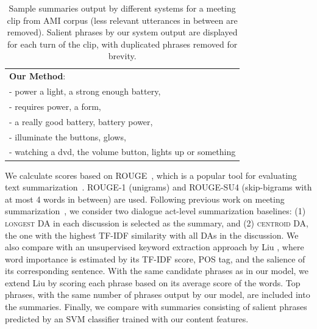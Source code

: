 \begin{table}[ht]
{{\begin{tabular}{|p{75mm}|}
	\textbf{Our Method}: \\
	- power a light, a strong enough battery, \\
	- requires power, a form, \\
	- a really good battery, battery power, \\
	- illuminate the buttons, glows, \\
	- watching a dvd, the volume button, lights up or something\\	
    \hline
    \end{tabular}
    
    }
	\caption{\fontsize{10}{12}\selectfont Sample summaries output by different systems for a meeting clip from AMI corpus (less relevant utterances in between are removed). Salient phrases by our system output are displayed for each turn of the clip, with duplicated phrases removed for brevity. }%
\label{fig:example_summary}
}
\end{table}




We calculate scores based on ROUGE~\cite{Lin:2003:AES:1073445.1073465}, which is a popular tool for evaluating text summarization~\cite{gillick2009global,liu2010using}. ROUGE-1 (unigrams) and ROUGE-SU4 (skip-bigrams with at most 4 words in between) are used. 
Following previous work on meeting summarization~\cite{Riedhammer:2010:LSS:1837521.1837625,wang-cardie:2013:ACL2013}, we consider two dialogue act-level summarization baselines: (1) \textsc{longest DA} in each discussion is selected as the summary, and (2) \textsc{centroid DA}, the one with the highest TF-IDF similarity with all DAs in the discussion. 
%
We also compare with an unsupervised keyword extraction approach by Liu \cite{liu2009unsupervised}, where word importance is estimated by its TF-IDF score, POS tag, and the salience of its corresponding sentence. With the same candidate phrases as in our model, we extend Liu \cite{liu2009unsupervised} by scoring each phrase based on its average score of the words. Top phrases, with the same number of phrases output by our model, are included into the summaries. 
%
Finally, we compare with summaries consisting of salient phrases predicted by an SVM classifier trained with our content features.

